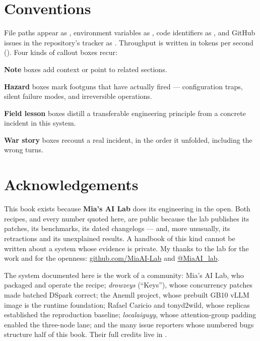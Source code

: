 \section*{Conventions}

File paths appear as , environment
variables as , code identifiers as
, and GitHub issues in the repository's tracker
as . Throughput is written in tokens per second (\tokspersec{}).
Four kinds of callout boxes recur:

\begin{hbnote}
\textbf{Note} boxes add context or point to related sections.
\end{hbnote}

\begin{hbwarning}
\textbf{Hazard} boxes mark footguns that have actually fired --- configuration
traps, silent failure modes, and irreversible operations.
\end{hbwarning}

\begin{hblesson}
\textbf{Field lesson} boxes distill a transferable engineering principle from
a concrete incident in this system.
\end{hblesson}

\begin{hbwarstory}
\textbf{War story} boxes recount a real incident, in the order it unfolded,
including the wrong turns.
\end{hbwarstory}

\section*{Acknowledgements}

This book exists because \textbf{Mia's AI Lab} does its engineering in the
open. Both recipes, and every number quoted here, are public because the lab
publishes its patches, its benchmarks, its dated changelogs --- and, more
unusually, its retractions and its unexplained results. A handbook of this
kind cannot be written about a system whose evidence is private. My thanks to
the lab for the work and for the openness:
\href{https://github.com/MiaAI-Lab}{github.com/MiaAI-Lab} and
\href{https://x.com/MiaAI_lab}{@MiaAI\_lab}.

The system documented here is the work of a community: Mia's AI Lab, who
packaged and operate the recipe; \emph{drowzeys} (``Keys''), whose concurrency
patches made batched DSpark correct; the Anemll project, whose prebuilt GB10
vLLM image is the runtime foundation; Rafael Caricio and tonyd2wild, whose
replicas established the reproduction baseline; \emph{localaiguyy}, whose
attention-group padding enabled the three-node lane; and the many issue
reporters whose numbered bugs structure half of this book. Their full credits
live in .
